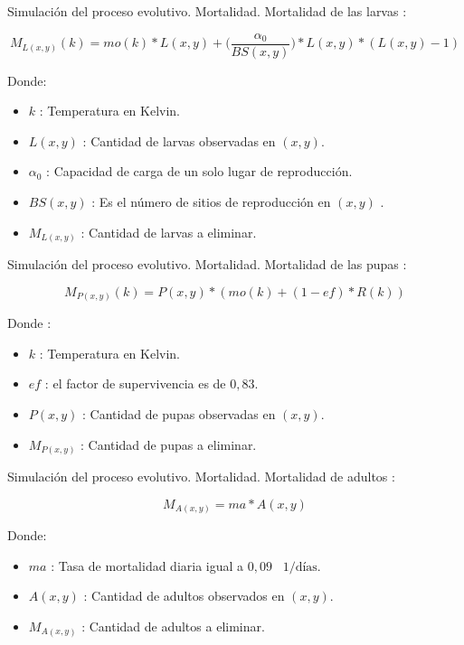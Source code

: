 \begin{frame}[c]{Simulación del proceso evolutivo. Mortalidad.}
Mortalidad de las larvas :
  \begin{center}
      \begin{equation}
      M_{L(x,y)}(k) = mo(k) * L(x,y) + \bigg(\frac{\alpha _{0}}{BS(x,y)}\bigg) * L(x,y) *(L(x,y) - 1)
    \end{equation}
  \end{center}
  Donde:
 \begin{itemize}
      \item $k$ : Temperatura en Kelvin.
      \item $L(x, y)$ : Cantidad de larvas observadas en $(x,y)$.
      \item $\alpha _{0}$ : Capacidad de carga de un solo lugar de reproducción.
      \item $BS(x,y)$ : Es el número de sitios de reproducción en $(x,y)$ .
      \item $M_{L(x,y)}$ : Cantidad de larvas a eliminar.
    \end{itemize}
\end{frame}


\begin{frame}[c]{Simulación del proceso evolutivo. Mortalidad.}
Mortalidad de las pupas :
\begin{center}
  \begin{equation}
      M_{P(x,y)}(k) = P(x,y) * (mo(k) + (1 - ef) * R(k))
  \end{equation}
\end{center}
Donde :
  \begin{itemize}
    \item $k$ : Temperatura en Kelvin.
    \item $ef$ : el factor de supervivencia es de $0,83$.
    \item $P(x, y)$ : Cantidad de pupas observadas en $(x,y)$.
    \item $M_{P(x,y)}$ : Cantidad de pupas a eliminar.
  \end{itemize}
\end{frame}

\begin{frame}[c]{Simulación del proceso evolutivo. Mortalidad.}
  Mortalidad de adultos :
  \begin{center}
    \begin{equation}
        M_{A(x,y)} = ma * A(x,y)
    \end{equation}
  \end{center}
  Donde:
    \begin{itemize}
      \item $ma$ : Tasa de mortalidad diaria igual a $0,09$ \ $1/\text{días}$.
      \item $A(x, y)$ : Cantidad de adultos observados en $(x,y)$.
      \item $M_{A(x,y)}$ : Cantidad de adultos a eliminar.
    \end{itemize}
\end{frame}


